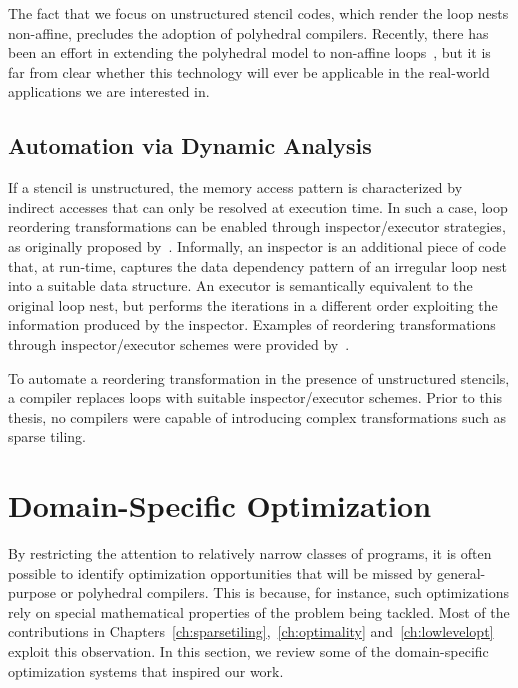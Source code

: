 The fact that we focus on unstructured stencil codes, which render the loop nests non-affine, precludes the adoption of polyhedral compilers. Recently, there has been an effort in extending the polyhedral model to non-affine loops~\citep{sparse-poly-framework}, but it is far from clear whether this technology will ever be applicable in the real-world applications we are interested in.


\subsection{Automation via Dynamic Analysis}
\label{sec:bkg:ie}

If a stencil is unstructured, the memory access pattern is characterized by indirect accesses that can only be resolved at execution time. In such a case, loop reordering transformations can be enabled through inspector/executor strategies, as originally proposed by~\cite{ST-Saltz91}. Informally, an inspector is an additional piece of code that, at run-time, captures the data dependency pattern of an irregular loop nest into a suitable data structure. An executor is semantically equivalent to the original loop nest, but performs the iterations in a different order exploiting the information produced by the inspector. Examples of reordering transformations through inspector/executor schemes were provided by~\cite{ST-StroutPLDI03}. 

To automate a reordering transformation in the presence of unstructured stencils, a compiler replaces loops with suitable inspector/executor schemes. Prior to this thesis, no compilers were capable of introducing complex transformations such as sparse tiling.






\section{Domain-Specific Optimization}
\label{sec:bkg:dslopt}
By restricting the attention to relatively narrow classes of programs, it is often possible to identify optimization opportunities that will be missed by general-purpose or polyhedral compilers. This is because, for instance, such optimizations rely on special mathematical properties of the problem being tackled. Most of the contributions in Chapters~\ref{ch:sparsetiling},~\ref{ch:optimality} and~\ref{ch:lowlevelopt} exploit this observation. In this section, we review some of the domain-specific optimization systems that inspired our work. 

